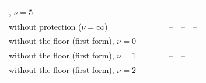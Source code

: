 {\begin{tabular}{p{1.6in}rrrrrr}
    \handicap{}, $\nu = 5$ & \AudDevHPrimeTFiveArrive{} & \AudDevHPrimeTFiveEnd{} & \AudDevHPrimeTFiveChanged{} & -- & -- & \AudDevHPrimeTFiveBound{} \\
    \handicap{} without protection ($\nu = \infty$) & \AudDevHPrimeTNoneArrive{} & \AudDevHPrimeTNoneEnd{} & \AudDevHPrimeTNoneChanged{} & -- & -- & -- \\
    \midrule
    \handicap{} without the floor (first form), $\nu = 0$ & \AudDevHTZeroArrive{} & \AudDevHTZeroEnd{} & \AudDevHTZeroChanged{} & -- & -- & \AudDevHTZeroBound{} \\
    \handicap{} without the floor (first form), $\nu = 1$ & \AudDevHTOneArrive{} & \AudDevHTOneEnd{} & \AudDevHTOneChanged{} & -- & -- & \AudDevHTOneBound{} \\
    \handicap{} without the floor (first form), $\nu = 2$ & \AudDevHTTwoArrive{} & \AudDevHTTwoEnd{} & \AudDevHTTwoChanged{} & -- & -- & \AudDevHTTwoBound{} \\
    \bottomrule
\end{tabular}}
